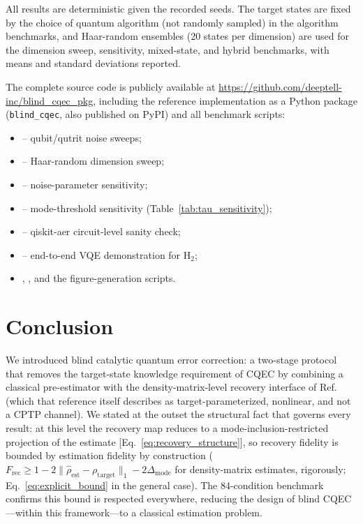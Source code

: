 \documentclass[pra,twocolumn,superscriptaddress,longbibliography,floatfix,nofootinbib]{revtex4-2}
\newcommand{\Frec}{F_\mathrm{rec}}
\newcommand{\rhot}{\rho_\mathrm{target}}
\newcommand{\rhoe}{\hat{\rho}_\mathrm{est}}
\begin{document}
All results are deterministic given the recorded seeds.
The target states are fixed by the choice of quantum algorithm (not randomly sampled) in the algorithm benchmarks, and Haar-random ensembles (20 states per dimension) are used for the dimension sweep, sensitivity, mixed-state, and hybrid benchmarks, with means and standard deviations reported.

The complete source code is publicly available at \url{https://github.com/deeptell-inc/blind_cqec_pkg}, including the reference implementation as a Python package (\texttt{blind\_cqec}, also published on PyPI) and all benchmark scripts:
\begin{itemize}\setlength{\itemsep}{0pt}\setlength{\parsep}{0pt}
  \item {} -- qubit/qutrit noise sweeps;
  \item {} -- Haar-random dimension sweep;
  \item {} -- noise-parameter sensitivity;
  \item {} -- mode-threshold sensitivity (Table~\ref{tab:tau_sensitivity});
  \item {} -- qiskit-aer circuit-level sanity check;
  \item {} -- end-to-end VQE demonstration for H$_2$;
  \item {}, , and the figure-generation scripts.
\end{itemize} 

      
\section{Conclusion}
\label{sec:conclusion}

We introduced blind catalytic quantum error correction: a two-stage protocol that removes the target-state knowledge requirement of CQEC by combining a classical pre-estimator with the density-matrix-level recovery interface of Ref.~\cite{Wakaura2026unified} (which that reference itself describes as target-parameterized, nonlinear, and not a CPTP channel).
We stated at the outset the structural fact that governs every result: at this level the recovery map reduces to a mode-inclusion-restricted projection of the estimate [Eq.~\eqref{eq:recovery_structure}], so recovery fidelity is bounded by estimation fidelity by construction ($\Frec \geq 1 - 2\|\rhoe - \rhot\|_1 - 2\Delta_\mathrm{mode}$ for density-matrix estimates, rigorously; Eq.~\eqref{eq:explicit_bound} in the general case).
The 84-condition benchmark confirms this bound is respected everywhere, reducing the design of blind CQEC---within this framework---to a classical estimation problem.
\end{document}
